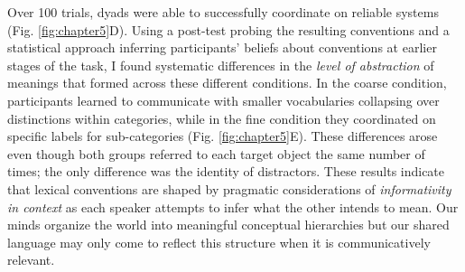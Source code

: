 \documentclass[11pt]{article}
\begin{document}
Over 100 trials, dyads were able to successfully coordinate on reliable systems (Fig. \ref{fig:chapter5}D).
Using a post-test probing the resulting conventions and a statistical approach inferring participants' beliefs about conventions at earlier stages of the task, I found systematic differences in the \emph{level of abstraction} of meanings that formed across these different conditions. 
In the coarse condition, participants learned to communicate with smaller vocabularies collapsing over distinctions within categories, while in the fine condition they coordinated on specific labels for sub-categories (Fig. \ref{fig:chapter5}E).
These differences arose even though both groups referred to each target object the same number of times; the only difference was the identity of distractors.
These results indicate that lexical conventions are shaped by pragmatic considerations of \textit{informativity in context} as each speaker attempts to infer what the other intends to mean.
Our minds organize the world into meaningful conceptual hierarchies but our shared language may only come to reflect this structure when it is communicatively relevant. 


\end{document}
